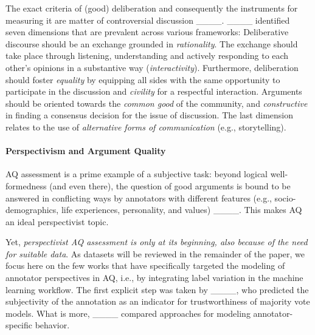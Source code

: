 The exact criteria of (good) deliberation and consequently the instruments for measuring it are matter of controversial discussion ____. ____ identified seven dimensions that are prevalent across various frameworks: Deliberative discourse should be an exchange grounded in \textit{rationality}. The exchange should take place through listening, understanding and actively responding to each other's opinions in a substantive way (\textit{interactivity}). Furthermore, deliberation should foster \textit{equality} by equipping all sides with the same opportunity to participate in the discussion and \textit{civility} for a respectful interaction. Arguments should be oriented towards the \textit{common good} of the community, and \textit{constructive} in finding a consensus decision for the issue of discussion. The last dimension relates to the use of \textit{alternative forms of communication} (e.g., storytelling).


\paragraph{Perspectivism and Argument Quality}

AQ assessment is a prime example of a subjective task: beyond logical well-formedness (and even there), the question of good arguments is bound to be answered in conflicting ways by annotators with different features (e.g., socio-demographics, life experiences, personality, and values) ____. This makes AQ an ideal perspectivist topic. 

Yet, \textit{perspectivist AQ assessment is only at its beginning, also because of the need for suitable data}. As datasets will be reviewed in the remainder of the paper, we focus here on the few works that have specifically targeted the {modeling of annotator perspectives} in AQ, i.e., by integrating label variation in the machine learning workflow. The first explicit step was taken by ____, who predicted the subjectivity of the annotation as an indicator for trustworthiness of majority vote models. What is more, ____ compared approaches for modeling annotator-specific behavior.